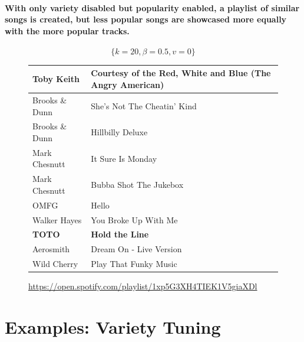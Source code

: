 \documentclass[a4paper, 12pt]{report}
\begin{document}
\paragraph{With only variety disabled but popularity enabled, a playlist of similar songs is created, but less popular songs are showcased more equally with the more popular tracks.}
\[\{k = 20, \beta = 0.5, v = 0\}\]
\begin{center}
    \begin{figure}[H]
        \begin{tabulary}{\linewidth}{|@{\makebox[2em][c]{\rownumber}}|L|L|} 
            \hline
            Toby Keith & Courtesy of the Red, White and Blue (The Angry American) \\ 
            \hline
            Brooks \& Dunn & She's Not The Cheatin' Kind \\
            \hline
            Brooks \& Dunn & Hillbilly Deluxe \\
            \hline
            Mark Chesnutt & It Sure Is Monday \\
            \hline
            Mark Chesnutt & Bubba Shot The Jukebox \\
            \hline
            OMFG & Hello \\
            \hline
            Walker Hayes & You Broke Up With Me \\
            \hline
            \textbf{TOTO} & \textbf{Hold the Line} \\
            \hline
            Aerosmith & Dream On - Live Version \\
            \hline
            Wild Cherry & Play That Funky Music \\
            \hline
        \end{tabulary}
    \caption{\url{https://open.spotify.com/playlist/1xp5G3XH4TIEK1V5giaXDl}}
    \end{figure}
\end{center}

\section{Examples: Variety Tuning}
\end{document}
